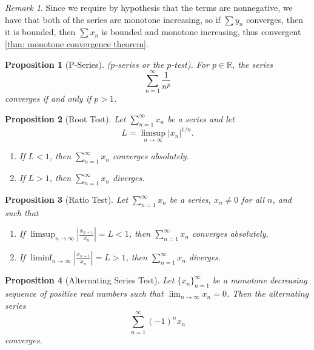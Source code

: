 \documentclass{article}
\newtheorem{proposition}{Proposition}[section]
\theoremstyle{definition}
\theoremstyle{remark}
\newtheorem{remark}{Remark}[section]
\begin{document}
\begin{remark}
Since we require by hypothesis that the terms are nonnegative, 
we have that both of the series are monotone increasing, so if $\sum{y_n}$ 
converges, then it is bounded, then $\sum{x_n}$ is bounded and monotone increasing, thus convergent \ref{thm: monotone convergence theorem}.
\end{remark}




\begin{proposition}[P-Series]\label{prp:p-series}
($p$-series or the $p$-test). For $p \in \mathbb{R}$, the series
\[
\sum_{n=1}^{\infty} \frac{1}{n^p}
\]
\textit{converges if and only if} $p > 1$.

\end{proposition}








\begin{proposition}[Root Test]\label{prp:root_test}
Let $\sum_{n=1}^{\infty} x_n$ be a series and let
\[
L = \limsup_{n \to \infty} |x_n|^{1/n}.
\]
\begin{enumerate}
\item If $L < 1$, then $\sum_{n=1}^{\infty} x_n$ \textit{converges absolutely}.
\item If $L > 1$, then $\sum_{n=1}^{\infty} x_n$ \textit{diverges}.
\end{enumerate}
\end{proposition}







\begin{proposition}[Ratio Test]\label{prp:ratio_test_Series}
Let $\sum_{n=1}^{\infty} x_n$ be a series, $x_n \neq 0$ for all $n$, and such that
\begin{enumerate}
\item If $\limsup_{n \to \infty} \left| \frac{x_{n+1}}{x_n} \right|  = L < 1$, then $\sum_{n=1}^{\infty} x_n$ \textit{converges absolutely}.
\item If $\liminf_{n \to \infty} \left| \frac{x_{n+1}}{x_n} \right|  = L > 1$, then $\sum_{n=1}^{\infty} x_n$ \textit{diverges}.
\end{enumerate}
\end{proposition}






\begin{proposition}[Alternating Series Test]\label{prp:alt_series_test}
Let \( \{x_n\}_{n=1}^\infty \) be a monotone decreasing sequence of positive real numbers such that \(\lim_{n \to \infty} x_n = 0\). Then the alternating series
\[
\sum_{n=1}^\infty (-1)^n x_n
\]
converges.
\end{proposition}
\end{document}
